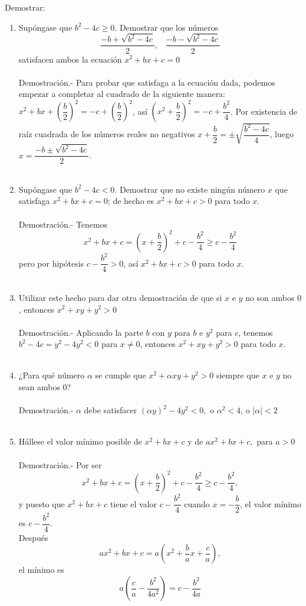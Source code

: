 \begin{teo} Demostrar:\\
\begin{enumerate}[\bfseries a)]
\item Supóngase que $b^2-4c\geq 0$. Demostrar que los números
$$\dfrac{-b+\sqrt{b^2-4c}}{2}, \; \; \; \dfrac{-b- \sqrt{b^2-4c}}{2}$$
satisfacen ambos la ecuación $x^2+bx+c	=0$\\\\
Demostración.- \; Para probar que satisfaga a la ecuación dada, podemos empezar a completar al cuadrado de la siguiente manera: $x^2+bx+\left(\dfrac{b}{2}\right)^2=-c+\left(\dfrac{b}{2}\right)^2$, así $\left( x^2+\dfrac{b}{2} \right)^2=-c+\dfrac{b^2}{4}$. Por existencia de raíz cuadrada de los números reales no negativos $x+\dfrac{b}{2} = \pm \sqrt{\dfrac{b^2-4c}{4}}$, luego $x=\dfrac{-b \pm \sqrt{b^2-4c}}{2}$.\\\\ 
\item Supóngase que $b^2-4c<0$. Demostrar que no existe ningún número $x$ que satisfaga $x^2+bx+c=0$; de hecho es $x^2+bx+c>0$ para todo $x$.\\\\
Demostración.- \: Tenemos $$x^2+bx+c=\left( x+\dfrac{b}{2}\right)^2+c-\dfrac{b^2}{4}\geq c- \dfrac{b^2}{4}$$ pero por hipótesis $c-\dfrac{b^2}{4}>0$, así $x^2+bx+c>0$ para todo $x$. \\\\
\item Utilizar este hecho para dar otra demostración de que si $x$ e $y$ no son ambos $0$, entonces $x^2+xy+y^2>0$\\\\
Demostración.- Aplicando la parte $b$ con $y$ para $b$ e $y^2$ para $c$, tenemos $b^2-4c=y^2-4y^2<0$ para $x \neq 0$, entonces $x^2+xy+y^2>0$ para todo $x$.\\\\ 
\item ¿Para qué número $\alpha$ se cumple que $x^2+\alpha xy + y^2>0$ siempre que $x$ e $y$ no sean ambos $0$?\\\\
Demostración.- \; $\alpha$ debe satisfacer $(\alpha y)^2-4y^2<0,$ o $\alpha^2<4$, o $|\alpha|<2$\\\\
\item Hállese el valor mínimo posible de $x^2+bx+c$ y de $ax^2+bx+c,$ para $a>0$\\\\
Demostración.- \; Por ser $$x^2+bx+c=\left( x+\dfrac{b}{2} \right)^2+ c-\dfrac{b^2}{4}\geq c- \dfrac{b^2}{4},$$ y puesto que $x^2+bx+c$ tiene el valor $c- \dfrac{b^2}{4}$ cuando $x=-\dfrac{b}{2}$, el valor mínimo es $c-\dfrac{b^2}{4}$.\\ Después $$ax^2+bx+c= a \left( x^2+\dfrac{b}{a}x+\dfrac{c}{a} \right),$$ el mínimo es $$a\left( \dfrac{c}{a} - \dfrac{b^2}{4a^2} \right) = c - \dfrac{b^2}{4a}$$\\\\
\end{enumerate}
\end{teo}

